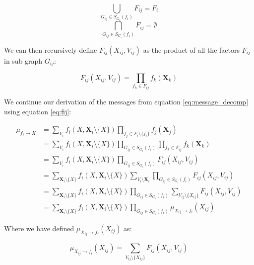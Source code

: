\begin{multicols}{2}
\begin{equation}
\bigcup_{G_{ij} \in S_{G_i}(f_i)} F_{ij} = F_i 
\end{equation}\break
\begin{equation}
\bigcap_{G_{ij} \in S_{G_i}(f_i)} F_{ij} = \emptyset
\end{equation}
\end{multicols}

\noindent
We can then recursively define $F_{ij}(X_{ij}, V_{ij})$
as the product of all the factors $F_{ij}$ in sub graph $G_{ij}$:

\begin{equation}\label{eq:fij}
F_{ij}(X_{ij}, V_{ij}) = \prod_{f_{k} \in F_{ij}}f_{k}(\textbf{X}_{k})
\end{equation}

\noindent
We continue our derivation of the messages from equation 
\ref{eq:message_decomp} using equation \ref{eq:fij}:

\begin{equation}\label{eq:message_var_to_fact_der}\begin{split}
\mu_{f_i \rightarrow X} 
	&= \sum_{V_i}f_i(X, \textbf{X}_i \setminus \{X\}) 
		\prod_{f_j \in F_i \setminus \{f_i\}} f_j(\textbf{X}_j)\\
	&= \sum_{V_i}f_i(X, \textbf{X}_i \setminus \{X\}) 
		\prod_{G_{ij} \in S_{G_i}(f_i)} \prod_{f_{k} \in F_{ij} }
			f_{k}(\textbf{X}_k)\\
	&= \sum_{V_i}f_i(X, \textbf{X}_i \setminus \{X\}) 
		\prod_{G_{ij} \in S_{G_i}(f_i)} F_{ij}(X_{ij}, V_{ij})\\
	&= \sum_{\textbf{X}_i\setminus \{X\}} f_i(X, \textbf{X}_i \setminus \{X\}) 
		\sum_{V_i \setminus \textbf{X}_i}\prod_{G_{ij} \in S_{G_i}(f_i)} 
			F_{ij}(X_{ij}, V_{ij})\\
	&= \sum_{\textbf{X}_i\setminus \{X\}} f_i(X, \textbf{X}_i \setminus \{X\}) 
		\prod_{G_{ij} \in S_{G_i}(f_i)} \sum_{V_{ij} \setminus \{X_{ij}\}}
			F_{ij}(X_{ij}, V_{ij})\\
	&= \sum_{\textbf{X}_i\setminus \{X\}} f_i(X, \textbf{X}_i \setminus \{X\}) 
		\prod_{G_{ij} \in S_{G_i}(f_i)} \mu_{X_{ij} \rightarrow f_i}(X_{ij})
\end{split}\end{equation}

\noindent
Where we have defined $\mu_{X_{ij} \rightarrow f_i}(X_{ij})$ as:

\begin{equation}\label{eq:message_var_to_fact}
\mu_{X_{ij} \rightarrow f_i}(X_{ij}) = \sum_{V_{ij} \setminus \{X_{ij}\}}
			F_{ij}(X_{ij}, V_{ij})
\end{equation}

